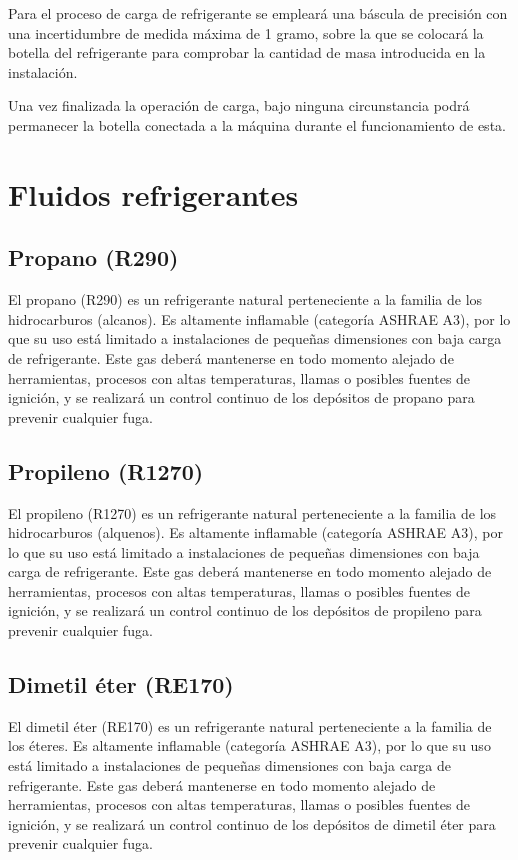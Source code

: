 \documentclass[../main.tex]{subfiles}
\begin{document}
Para el proceso de carga de refrigerante se empleará una báscula de precisión con una incertidumbre de medida máxima de 1 gramo, sobre la que se colocará la botella del refrigerante para comprobar la cantidad de masa introducida en la instalación.

Una vez finalizada la operación de carga, bajo ninguna circunstancia podrá permanecer la botella conectada a la máquina durante el funcionamiento de esta.

\newpage

\section{Fluidos refrigerantes}

\subsection{Propano (R290)}

El propano (R290) es un refrigerante natural perteneciente a la familia de los hidrocarburos (alcanos). Es altamente inflamable (categoría ASHRAE A3), por lo que su uso está limitado a instalaciones de pequeñas dimensiones con baja carga de refrigerante. Este gas deberá mantenerse en todo momento alejado de herramientas, procesos con altas temperaturas, llamas o posibles fuentes de ignición, y se realizará un control continuo de los depósitos de propano para prevenir cualquier fuga.

\subsection{Propileno (R1270)}

El propileno (R1270) es un refrigerante natural perteneciente a la familia de los hidrocarburos (alquenos). Es altamente inflamable (categoría ASHRAE A3), por lo que su uso está limitado a instalaciones de pequeñas dimensiones con baja carga de refrigerante. Este gas deberá mantenerse en todo momento alejado de herramientas, procesos con altas temperaturas, llamas o posibles fuentes de ignición, y se realizará un control continuo de los depósitos de propileno para prevenir cualquier fuga.

\subsection{Dimetil éter (RE170)}

El dimetil éter (RE170) es un refrigerante natural perteneciente a la familia de los éteres. Es altamente inflamable (categoría ASHRAE A3), por lo que su uso está limitado a instalaciones de pequeñas dimensiones con baja carga de refrigerante. Este gas deberá mantenerse en todo momento alejado de herramientas, procesos con altas temperaturas, llamas o posibles fuentes de ignición, y se realizará un control continuo de los depósitos de dimetil éter para prevenir cualquier fuga.
\end{document}
